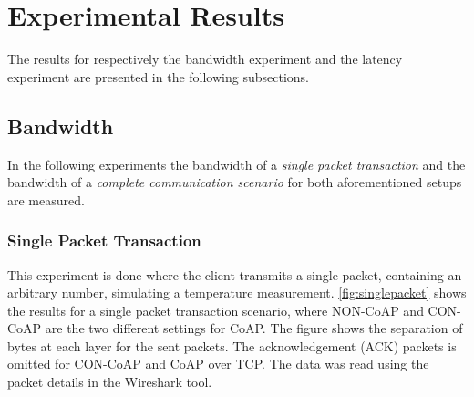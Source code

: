 \section{Experimental Results}\label{sec:experimentalresults}
The results for respectively the bandwidth experiment and the latency experiment are presented in the following subsections.

\subsection{Bandwidth}
In the following experiments the bandwidth of a \emph{single packet transaction} and the bandwidth of a \emph{complete communication scenario} for both aforementioned setups are measured. 

\subsubsection{Single Packet Transaction}
This experiment is done where the client transmits a single packet, containing an arbitrary number, simulating a temperature measurement. \figurename{\ref{fig:singlepacket}} shows the results for a single packet transaction scenario, where NON-CoAP and CON-CoAP are the two different settings for CoAP.
The figure shows the separation of bytes at each layer for the sent packets. The acknowledgement (ACK) packets is omitted for CON-CoAP and CoAP over TCP. The data was read using the packet details in the Wireshark tool. 

